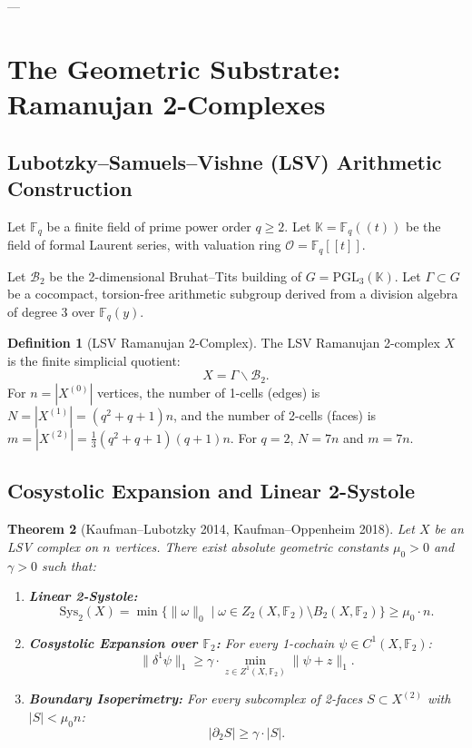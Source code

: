 \documentclass[11pt,a4paper]{article}
\theoremstyle{plain}
\newtheorem{theorem}{Theorem}[section]
\theoremstyle{definition}
\newtheorem{definition}[theorem]{Definition}
\theoremstyle{remark}
\begin{document}
---

\section{The Geometric Substrate: Ramanujan 2-Complexes}

\subsection{Lubotzky--Samuels--Vishne (LSV) Arithmetic Construction}

Let $\mathbb{F}_q$ be a finite field of prime power order $q \ge 2$. Let $\mathbb{K} = \mathbb{F}_q((t))$ be the field of formal Laurent series, with valuation ring $\mathcal{O} = \mathbb{F}_q[[t]]$. 

Let $\mathcal{B}_2$ be the 2-dimensional Bruhat--Tits building of $G = \mathrm{PGL}_3(\mathbb{K})$.
Let $\Gamma \subset G$ be a cocompact, torsion-free arithmetic subgroup derived from a division algebra of degree 3 over $\mathbb{F}_q(y)$.

\begin{definition}[LSV Ramanujan 2-Complex]
The LSV Ramanujan 2-complex $X$ is the finite simplicial quotient:
\[
X = \Gamma \backslash \mathcal{B}_2.
\]
For $n = |X^{(0)}|$ vertices, the number of 1-cells (edges) is $N = |X^{(1)}| = (q^2+q+1)n$, and the number of 2-cells (faces) is $m = |X^{(2)}| = \frac{1}{3}(q^2+q+1)(q+1)n$. For $q=2$, $N = 7n$ and $m = 7n$.
\end{definition}

\subsection{Cosystolic Expansion and Linear 2-Systole}

\begin{theorem}[Kaufman--Lubotzky 2014, Kaufman--Oppenheim 2018]\label{thm:lsv_expansion}
Let $X$ be an LSV complex on $n$ vertices. There exist absolute geometric constants $\mu_0 > 0$ and $\gamma > 0$ such that:
\begin{enumerate}
    \item \textbf{Linear 2-Systole:}
    \[
    \mathrm{Sys}_2(X) = \min \{ \|\omega\|_0 \mid \omega \in Z_2(X, \mathbb{F}_2) \setminus B_2(X, \mathbb{F}_2) \} \ge \mu_0 \cdot n.
    \]
    \item \textbf{Cosystolic Expansion over $\mathbb{F}_2$:} For every 1-cochain $\psi \in C^1(X, \mathbb{F}_2)$:
    \[
    \|\delta^1 \psi\|_1 \ge \gamma \cdot \min_{z \in Z^1(X, \mathbb{F}_2)} \|\psi + z\|_1.
    \]
    \item \textbf{Boundary Isoperimetry:} For every subcomplex of 2-faces $S \subset X^{(2)}$ with $|S| < \mu_0 n$:
    \[
    |\partial_2 S| \ge \gamma \cdot |S|.
    \]
\end{enumerate}
\end{theorem}
\end{document}
